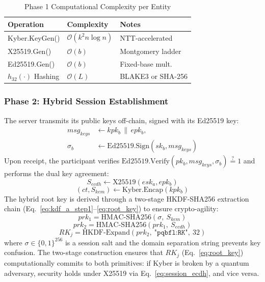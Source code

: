 \documentclass[journal, 10pt, twocolumn]{IEEEtran}
\begin{document}
\begin{table}[H]
\centering
\caption{Phase 1 Computational Complexity per Entity}
\label{tab:phase1_complexity}
\begin{tabular}{l l l}
\toprule
\textbf{Operation} & \textbf{Complexity} & \textbf{Notes} \\
\midrule
Kyber.KeyGen() & $\mathcal{O}(k^2 n \log n)$ & NTT-accelerated \\
X25519.Gen() & $\mathcal{O}(b)$ & Montgomery ladder \\
Ed25519.Gen() & $\mathcal{O}(b)$ & Fixed-base mult. \\
$h_{32}(\cdot)$ Hashing & $\mathcal{O}(L)$ & BLAKE3 or SHA-256 \\
\bottomrule
\end{tabular}
\end{table}

\subsubsection{Phase 2: Hybrid Session Establishment}


The server transmits its public keys off-chain, signed with its Ed25519 key:
\begin{equation}
\begin{split}
msg_{keys} &\leftarrow kpk_b \,\|\, epk_b, \\
\sigma_b &\leftarrow \text{Ed25519.Sign}(sk_b, msg_{keys})
\end{split}
\label{eq:session_send}
\end{equation}
Upon receipt, the participant verifies $\text{Ed25519.Verify}(pk_b, msg_{keys}, \sigma_b) \stackrel{?}{=} 1$ and performs the dual key agreement:
\begin{equation}
S_{ecdh} \leftarrow \text{X25519}(esk_a, epk_b)
\label{eq:session_ecdh}
\end{equation}
\begin{equation}
(ct, S_{kem}) \leftarrow \text{Kyber.Encap}(kpk_b)
\label{eq:session_kem}
\end{equation}
The hybrid root key is derived through a two-stage HKDF-SHA256 extraction chain (Eq.~\eqref{eq:kdf_a_step1}--\eqref{eq:root_key}) to ensure crypto-agility:
\begin{equation}
prk_1 = \text{HMAC-SHA256}(\sigma,\ S_{kem})
\label{eq:kdf_a_step1}
\end{equation}
\begin{equation}
prk_2 = \text{HMAC-SHA256}(prk_1,\ S_{ecdh})
\label{eq:kdf_a_step2}
\end{equation}
\begin{equation}
RK_j = \text{HKDF-Expand}(prk_2,\ \texttt{"pqbfl:RK"},\ 32)
\label{eq:root_key}
\end{equation}
where $\sigma \in \{0,1\}^{256}$ is a session salt and the domain separation string prevents key confusion. The two-stage construction ensures that $RK_j$ (Eq.~\eqref{eq:root_key}) computationally commits to both primitives: if Kyber is broken by a quantum adversary, security holds under X25519 via Eq.~\eqref{eq:session_ecdh}, and vice versa.
\end{document}
